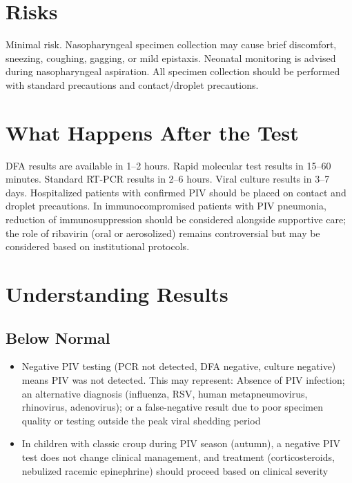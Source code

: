 \section*{Risks}
Minimal risk. Nasopharyngeal specimen collection may cause brief discomfort, sneezing, coughing, gagging, or mild epistaxis. Neonatal monitoring is advised during nasopharyngeal aspiration. All specimen collection should be performed with standard precautions and contact/droplet precautions.

\section*{What Happens After the Test}
DFA results are available in 1--2 hours. Rapid molecular test results in 15--60 minutes. Standard RT-PCR results in 2--6 hours. Viral culture results in 3--7 days. Hospitalized patients with confirmed PIV should be placed on contact and droplet precautions. In immunocompromised patients with PIV pneumonia, reduction of immunosuppression should be considered alongside supportive care; the role of ribavirin (oral or aerosolized) remains controversial but may be considered based on institutional protocols.

\section*{Understanding Results}

\subsection*{Below Normal}
\begin{itemize}
  \item Negative PIV testing (PCR not detected, DFA negative, culture negative) means PIV was not detected. This may represent: Absence of PIV infection; an alternative diagnosis (influenza, RSV, human metapneumovirus, rhinovirus, adenovirus); or a false-negative result due to poor specimen quality or testing outside the peak viral shedding period
  \item In children with classic croup during PIV season (autumn), a negative PIV test does not change clinical management, and treatment (corticosteroids, nebulized racemic epinephrine) should proceed based on clinical severity
\end{itemize}


